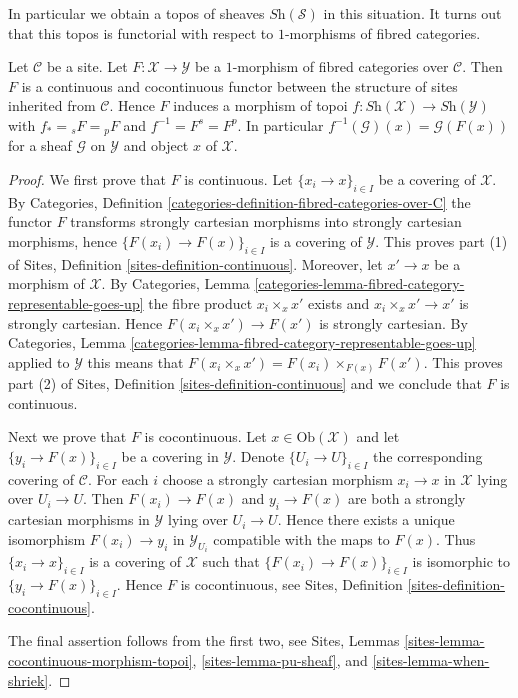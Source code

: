 \noindent
In particular we obtain a topos of sheaves $\textit{Sh}(\mathcal{S})$
in this situation. It turns out that this topos is functorial with respect
to $1$-morphisms of fibred categories.

\begin{lemma}
\label{lemma-topology-inherited-functorial}
Let $\mathcal{C}$ be a site. Let $F : \mathcal{X} \to \mathcal{Y}$
be a $1$-morphism of fibred categories over $\mathcal{C}$.
Then $F$ is a continuous and cocontinuous functor between the structure
of sites inherited from $\mathcal{C}$. Hence $F$ induces a morphism of topoi
$f : \textit{Sh}(\mathcal{X}) \to \textit{Sh}(\mathcal{Y})$ with
$f_* = {}_sF = {}_pF$ and $f^{-1} = F^s = F^p$. In particular
$f^{-1}(\mathcal{G})(x) = \mathcal{G}(F(x))$
for a sheaf $\mathcal{G}$ on $\mathcal{Y}$ and object $x$ of $\mathcal{X}$.
\end{lemma}

\begin{proof}
We first prove that $F$ is continuous.
Let $\{x_i \to x\}_{i \in I}$ be a covering of $\mathcal{X}$. By
Categories, Definition \ref{categories-definition-fibred-categories-over-C}
the functor $F$ transforms strongly cartesian morphisms into strongly
cartesian morphisms, hence $\{F(x_i) \to F(x)\}_{i \in I}$ is a covering
of $\mathcal{Y}$. This proves part (1) of
Sites, Definition \ref{sites-definition-continuous}.
Moreover, let $x' \to x$ be a morphism of $\mathcal{X}$. By
Categories, Lemma \ref{categories-lemma-fibred-category-representable-goes-up}
the fibre product $x_i \times_x x'$ exists and $x_i \times_x x' \to x'$
is strongly cartesian. Hence $F(x_i \times_x x') \to F(x')$ is strongly
cartesian. By
Categories, Lemma \ref{categories-lemma-fibred-category-representable-goes-up}
applied to $\mathcal{Y}$ this means that
$F(x_i \times_x x') = F(x_i) \times_{F(x)} F(x')$.
This proves part (2) of
Sites, Definition \ref{sites-definition-continuous}
and we conclude that $F$ is continuous.

\medskip\noindent
Next we prove that $F$ is cocontinuous.
Let $x \in \text{Ob}(\mathcal{X})$ and let $\{y_i \to F(x)\}_{i \in I}$
be a covering in $\mathcal{Y}$. Denote $\{U_i \to U\}_{i \in I}$ the
corresponding covering of $\mathcal{C}$. For each $i$ choose a strongly
cartesian morphism $x_i \to x$ in $\mathcal{X}$ lying over $U_i \to U$.
Then $F(x_i) \to F(x)$ and $y_i \to F(x)$ are both a strongly cartesian
morphisms in $\mathcal{Y}$ lying over $U_i \to U$. Hence there exists
a unique isomorphism $F(x_i) \to y_i$ in $\mathcal{Y}_{U_i}$ compatible
with the maps to $F(x)$. Thus $\{x_i \to x\}_{i \in I}$ is a covering of
$\mathcal{X}$ such that $\{F(x_i) \to F(x)\}_{i \in I}$ is isomorphic to
$\{y_i \to F(x)\}_{i \in I}$. Hence $F$ is cocontinuous, see
Sites, Definition \ref{sites-definition-cocontinuous}.

\medskip\noindent
The final assertion follows from the first two, see
Sites, Lemmas
\ref{sites-lemma-cocontinuous-morphism-topoi},
\ref{sites-lemma-pu-sheaf}, and
\ref{sites-lemma-when-shriek}.
\end{proof}

